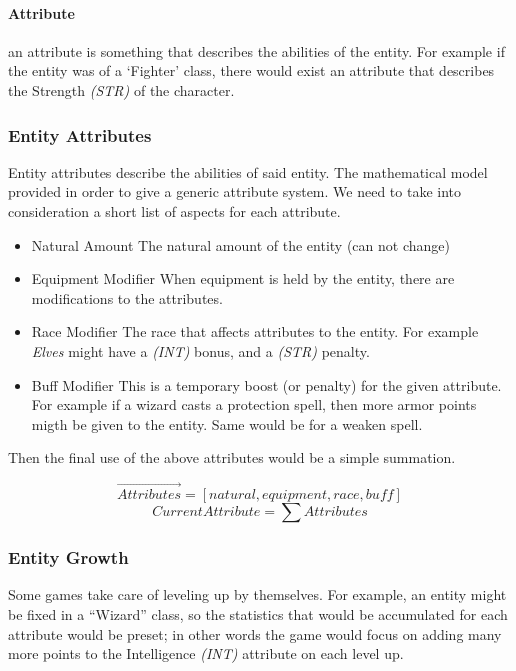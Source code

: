 \paragraph{Attribute} an attribute is something that describes the abilities of
the entity. For example if the entity was of a `Fighter' class, there would 
exist an attribute that describes the Strength \textit{(STR)} of the character.

\subsubsection{Entity Attributes} 

Entity attributes describe the abilities of said entity. The mathematical model
provided in order to give a generic attribute system. We need to take into
consideration a short list of aspects for each attribute.

\begin{itemize}
  \item{Natural Amount} The natural amount of the entity (can not change)
  \item{Equipment Modifier} When equipment is held by the entity, there are
  modifications to the attributes. 
  \item{Race Modifier} The race that affects attributes to the entity. For
  example \textit{Elves} might have a \textit{(INT)} bonus, and a \textit{(STR)}
  penalty.
  \item{Buff Modifier} This is a temporary boost (or penalty) for the given
  attribute. For example if a wizard casts a protection spell, then more armor
  points migth be given to the entity. Same would be for a weaken spell.
\end{itemize}

Then the final use of the above attributes would be a simple summation.

$$ \vec{Attributes} = [natural, equipment, race, buff] $$ 
$$ CurrentAttribute = \sum{Attributes} $$

\subsubsection{Entity Growth}

Some games take care of leveling up by themselves. For example, an entity might
be fixed in a ``Wizard'' class, so the statistics that would be accumulated for
each attribute would be preset; in other words the game would focus on adding 
many more points to the Intelligence \textit{(INT)} attribute on each level up.


